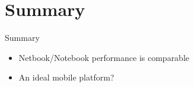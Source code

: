 \documentclass{beamer}
\begin{document}
\section*{Summary}

\begin{frame}{Summary}

\begin{itemize}
\item Netbook/Notebook performance is comparable
\item An ideal mobile platform?
\end{itemize}

\end{frame}
\end{document}
